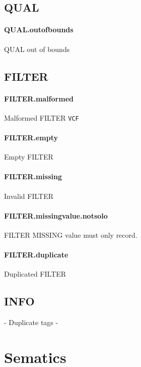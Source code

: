 \documentclass[10pt]{article}
\newcommand{\vcfstrictrule}[5]{
	\paragraph{#1} #2 #4	
	#5
	\par
}
\newcommand{\vcfspec}{\tt VCF}
\newcommand{\phredoob}[2] {
	\vcfstrictrule{#1}{#2}{Phred-scaled fields must be greater than or equal to zero.}{}{}
}
\begin{document}
\subsection{QUAL}

\phredoob{QUAL.outofbounds}{QUAL out of bounds}

\subsection{FILTER}

\vcfstrictrule{FILTER.malformed}{Malformed FILTER}{ Filter cannot be \tt{0}.}{\vcfspec}{}
\vcfstrictrule{FILTER.empty}{Empty FILTER}{ Filter cannot be the empty string.}{}{}
\vcfstrictrule{FILTER.missing}{Invalid FILTER}{ Missing FILTER meta-information line. }{}{}
\vcfstrictrule{FILTER.missingvalue.notsolo}{FILTER MISSING value must only record.}{ No other values can be present if the MISSING value is present.}{}{}
\vcfstrictrule{FILTER.duplicate}{Duplicated FILTER}{ FILTER is not unique within this record. }{}{}

\subsection{INFO}

- Duplicate tags
- 

\section{Sematics}
\end{document}

